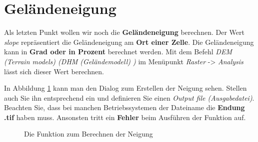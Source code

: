 \documentclass[a4paper,12pt,ngerman]{sphinxmanual}
\begin{document}
\section{Geländeneigung}
\label{uebung2:gelandeneigung}
Als letzten Punkt wollen wir noch die \textbf{Geländeneigung} berechnen. Der Wert \emph{slope} repräsentiert die Geländeneigung am \textbf{Ort einer Zelle}. Die Geländeneigung kann in \textbf{Grad oder in Prozent} berechnet werden. Mit dem Befehl \emph{DEM (Terrain models) (DHM (Geländemodell) )} im Menüpunkt \emph{Raster} -\textgreater{} \emph{Analysis} lässt sich dieser Wert berechnen.

In Abbildung \hyperref[uebung2:figsneigung]{ \ref*{uebung2:figsneigung}} kann man den Dialog zum Erstellen der Neigung sehen. Stellen auch Sie ihn entsprechend ein und definieren Sie einen \emph{Output file (Ausgabedatei)}. Beachten Sie, dass bei manchen Betriebssystemen der Dateiname die \textbf{Endung .tif} haben muss. Ansonsten tritt ein \textbf{Fehler} beim Ausführen der Funktion auf.
\begin{figure}[htbp]
\centering
\capstart

\caption{Die Funktion zum Berechnen der Neigung}\label{uebung2:figsneigung}\end{figure}
\end{document}
